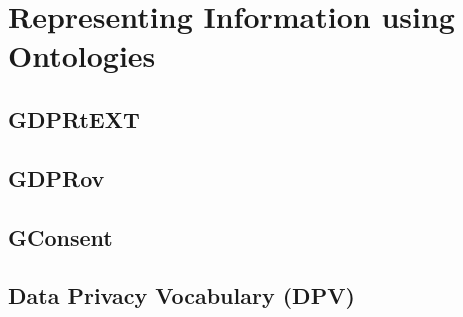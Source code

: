\chapter{Representing Information using Ontologies}
\label{chapter:vocabularies}

\section{GDPRtEXT}\label{sec:voc:GDPRtEXT}

\section{GDPRov}\label{sec:voc:GDPRov}

\section{GConsent}\label{sec:voc:GConsent}

\section{Data Privacy Vocabulary (DPV)}\label{sec:voc:DPV}